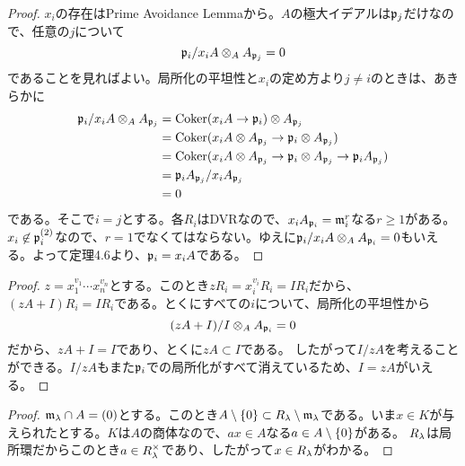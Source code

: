 \begin{proof}
  $x_i$の存在はPrime Avoidance Lemmaから。$A$の極大イデアルは$\mathfrak{p}_j$だけなので、任意の$j$について
  \[
  \mathfrak{p}_i / x_i A \otimes_A A_{\mathfrak{p}_j} = 0
  \]
  であることを見ればよい。局所化の平坦性と$x_i$の定め方より$j \neq i$のときは、あきらかに
  \begin{align*}
    \mathfrak{p}_i / x_i A \otimes_A A_{\mathfrak{p}_j} &= \operatorname{Coker}(x_i A \to \mathfrak{p}_i) \otimes A_{\mathfrak{p}_j} \\
    &= \operatorname{Coker}(x_i A \otimes A_{\mathfrak{p}_j} \to \mathfrak{p}_i \otimes A_{\mathfrak{p}_j})  \\
    &= \operatorname{Coker}(x_i A \otimes A_{\mathfrak{p}_j} \to \mathfrak{p}_i \otimes A_{\mathfrak{p}_j} \to \mathfrak{p}_i A_{\mathfrak{p}_j}) \\
    &= \mathfrak{p}_i A_{\mathfrak{p}_j} / x_i A_{\mathfrak{p}_j} \\
    &= 0
  \end{align*}
である。そこで$i=j$とする。各$R_{i}$はDVRなので、$x_i A_{\mathfrak{p}_i} = \mathfrak{m}_i^{r}$なる$r \geq 1$がある。$x_i \not\in \mathfrak{p}_i^{(2)}$なので、$r=1$でなくてはならない。ゆえに$\mathfrak{p}_i / x_i A \otimes_A A_{\mathfrak{p}_i} = 0$もいえる。よって定理4.6より、$\mathfrak{p}_i = x_i A $である。
\end{proof}



\begin{proof}
  $z = x_1^{v_1} \cdots x_n^{v_n}$とする。このとき$zR_i = x_i^{v_i} R_i = I R_i$だから、$(zA+I)R_i = I R_i$である。とくにすべての$i$について、局所化の平坦性から
  \[
  (zA + I)/I \otimes_A A_{\mathfrak{p}_i} = 0
  \]
  だから、$zA + I = I$であり、とくに$zA \subset I$である。
  したがって$I/zA$を考えることができる。$I/zA$もまた$\mathfrak{p}_i$での局所化がすべて消えているため、$I = zA$がいえる。
\end{proof}



\begin{proof}
$\mathfrak{m}_{{\lambda}} \cap A = (0)$とする。このとき$A \setminus \{ 0 \} \subset R_{{\lambda}} \setminus \mathfrak{m}_{{\lambda}}$である。いま$x \in K$が与えられたとする。$K$は$A$の商体なので、$ax \in A $なる$a \in A \setminus \{ 0 \}$がある。
$R_{{\lambda}}$は局所環だからこのとき$a \in R_{{\lambda}}^{\times}$であり、したがって$x \in R_{{\lambda}}$がわかる。
\end{proof}



